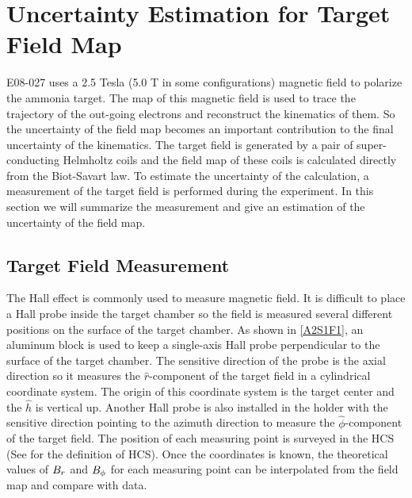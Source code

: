 
\chapter{Uncertainty Estimation for Target Field Map}
\label{A2}

E08-027 uses a 2.5 Tesla (5.0 T in some configurations) magnetic field to polarize the ammonia target. The map of this magnetic field is used to trace the trajectory of the out-going electrons and reconstruct the kinematics of them. So the uncertainty of the field map becomes an important contribution to the final uncertainty of the kinematics. The target field is generated by a pair of super-conducting Helmholtz coils and the field map of these coils is calculated directly from the Biot-Savart law. To estimate the uncertainty of the calculation, a measurement of the target field is performed during the experiment. In this section we will summarize the measurement and give an estimation of the uncertainty of the field map.

\section{Target Field Measurement}
\label{A2S1}

The Hall effect is commonly used to measure magnetic field. It is difficult to place a Hall probe inside the target chamber so the field is measured several different positions on the surface of the target chamber. As shown in \cref{A2S1F1}, an aluminum block is used to keep a single-axis Hall probe perpendicular to the surface of the target chamber. The sensitive direction of the probe is the axial direction so it measures the $\hat{r}$-component of the target field in a cylindrical coordinate system. The origin of this coordinate system is the target center and the $\hat{h}$ is vertical up. Another Hall probe is also installed in the holder with the sensitive direction pointing to the azimuth direction to measure the $\hat{\phi}$-component of the target field. The position of each measuring point is surveyed in the HCS (See  for the definition of HCS). Once the coordinates is known, the theoretical values of $B_r$ and $B_{\phi}$ for each measuring point can be interpolated from the field map and compare with data.

